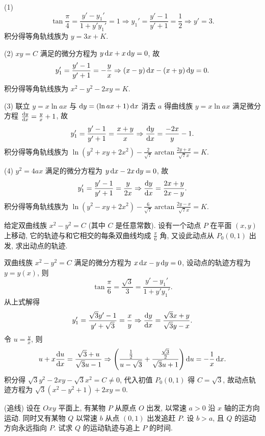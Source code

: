 \begin{solution}
  (1)
  \[\tan\frac{\pi}{4}=\frac{y'-y_1'}{1+y'y_1'}=1\Rightarrow y_1'
    = \frac{y'-1}{y'+1}=\frac{1}{2}\Rightarrow y'=3.\]
  积分得等角轨线族为 $y=3x+K$.

  (2) $xy=C$ 满足的微分方程为 $y\mathop{}\!\mathrm{d} x+x\mathop{}\!\mathrm{d} y=0$, 故
  \[y_1'=\frac{y'-1}{y'+1}=-\frac{y}{x}\Rightarrow(x-y)\mathop{}\!\mathrm{d} x-(x+y)\mathop{}\!\mathrm{d} y=0.\]
  积分得等角轨线族为 $x^2-y^2-2xy=K$.

  (3) 联立 $y=x\ln ax$ 与 $\mathop{}\!\mathrm{d} y=(\ln ax+1)\mathop{}\!\mathrm{d} x$
  消去 $a$ 得曲线族 $y=x\ln ax$ 满足微分方程 $\frac{\mathop{}\!\mathrm{d} y}{\mathop{}\!\mathrm{d} x}=\frac{y}{x}+1$, 故
  \[y_1'=\frac{y'-1}{y'+1}=\frac{x+y}{x}\Rightarrow\frac{\mathop{}\!\mathrm{d} y}{\mathop{}\!\mathrm{d} x}=\frac{-2x}{y}-1.\]
  积分得等角轨线族为 $\ln(y^2+xy+2x^2)-\frac{2}{\sqrt{7}}\arctan\frac{2y+x}{\sqrt{7}x}=K$.

  (4) $y^2=4ax$ 满足的微分方程为 $y\mathop{}\!\mathrm{d} x-2x\mathop{}\!\mathrm{d} y=0$, 故
  \[y_1'=\frac{y'-1}{y'+1}=\frac{y}{2x}\Rightarrow\frac{\mathop{}\!\mathrm{d} y}{\mathop{}\!\mathrm{d} x}=\frac{2x+y}{2x-y}.\]
  积分得等角轨线族为 $\ln(y^2-xy+2x^2)-\frac{6}{\sqrt{7}}\arctan\frac{2y-x}{\sqrt{7}x}=K$.
\end{solution}



\begin{exercise}
  给定双曲线族 $x^2-y^2=C$ (其中 $C$ 是任意常数). 设有一个动点 $P$ 在平面 $(x,y)$ 上移动,
  它的轨迹与和它相交的每条双曲线均成 $\frac{\pi}{6}$ 角, 又设此动点从 $P_0(0,1)$ 出发, 求出动点的轨迹.
\end{exercise}

\begin{solution}
  双曲线族 $x^2-y^2=C$ 满足的微分方程为 $x\mathop{}\!\mathrm{d} x-y\mathop{}\!\mathrm{d} y=0$, 设动点的轨迹方程为 $y=y(x)$, 则
  \[\tan\frac{\pi}{6}=\frac{\sqrt{3}}{3}=\frac{y'-y_1'}{1+y'y_1'}.\]
  从上式解得
  \[y_1'=\frac{\sqrt{3}y'-1}{y'+\sqrt{3}}=\frac{x}{y}
    \Rightarrow\frac{\mathop{}\!\mathrm{d} y}{\mathop{}\!\mathrm{d} x}=\frac{\sqrt{3}x+y}{\sqrt{3}y-x}.\]
  令 $u=\frac{y}{x}$, 则
  \[u+x\frac{\mathop{}\!\mathrm{d} u}{\mathop{}\!\mathrm{d} x}=\frac{\sqrt{3}+u}{\sqrt{3}u-1}
    \Rightarrow\left(\frac{\frac{1}{2}}{u-\sqrt{3}}
      + \frac{\frac{\sqrt{3}}{2}}{\sqrt{3}u+1}\right)\mathop{}\!\mathrm{d} u=-\frac{1}{x}\mathop{}\!\mathrm{d} x.\]
  积分得 $\sqrt{3}y^2-2xy-\sqrt{3}x^2=C\neq 0$, 代入初值 $P_0(0,1)$ 得 $C=\sqrt{3}$,
  故动点轨迹方程为 $\sqrt{3}(x^2-y^2+1)+2xy=0$.
\end{solution}



\begin{exercise}(追线) 
  设在 $Oxy$ 平面上, 有某物 $P$ 从原点 $O$ 出发, 以常速 $a>0$ 沿 $x$ 轴的正方向运动. 
  同时又有某物 $Q$ 以常速 $b$ 从点 $(0,1)$ 出发追赶 $P$. 设 $b>a$, 且 $Q$ 的运动方向永远指向 $P$. 
  试求 $Q$ 的运动轨迹与追上 $P$ 的时间.
\end{exercise}

